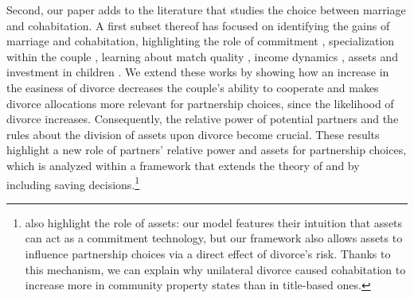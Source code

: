 \documentclass[12pt]{article}
\numberwithin{table}{section}
\begin{document}
Second, our paper adds to the literature that studies the choice between marriage and cohabitation. A first subset thereof has focused on identifying the gains of marriage and cohabitation, highlighting the role of commitment \citep{matouschek2008}, specialization within the couple \citep{gemici2014}, learning about match quality \citep{brien2006}, income dynamics \citep{blasutto2020}, assets \citep{lafortune2017, lafortune2020} and investment in children \citep{lundberg2015}. We extend these works by showing how an increase in the easiness of divorce decreases the couple's ability to cooperate and makes divorce allocations more relevant for partnership choices, since the likelihood of divorce increases. Consequently, the relative power of potential partners and the rules about the division of assets upon divorce become crucial. These results highlight a new role of partners' relative power and assets for partnership choices, which is analyzed within a framework that extends the theory of \cite{blasutto2020} and \cite{gemici2014} by including saving decisions.\footnote{\cite{lafortune2020} also highlight the role of assets: our model features their intuition that assets can act as a commitment technology, but our framework also allows assets to influence partnership choices via a direct effect of divorce's risk. Thanks to this mechanism, we can explain why unilateral divorce caused cohabitation to increase more in community property states than in title-based ones.}
\end{document}
